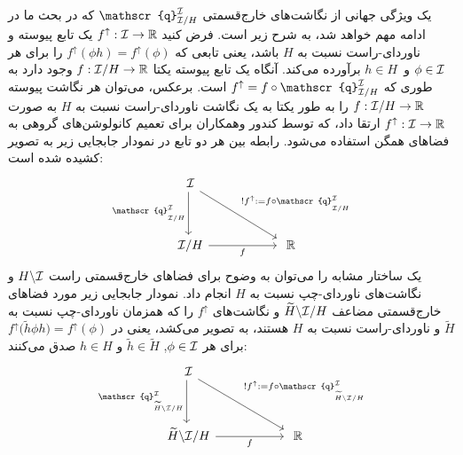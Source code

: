 یک ویژگی جهانی از نگاشت‌های خارج‌قسمتی $\mathscr{q}^{\I}_{\I/H}$ که در بحث ما در ادامه مهم خواهد شد، به شرح زیر است.
فرض کنید $f^\uparrow: \mathcal{I} \to \mathbb{R}$ یک تابع پیوسته و ناوردای-راست نسبت به $H$ باشد، یعنی تابعی که $f^\uparrow(\phi h) = f^\uparrow(\phi)$ را برای هر $\phi\in\mathcal{I}$ و~$h\in H$ برآورده می‌کند.
آنگاه یک تابع پیوسته یکتا $f: \mathcal{I}/H \to \mathbb{R}$ وجود دارد به طوری که $f^\uparrow = f \circ \mathscr{q}^{\I}_{\I/H}$ است.
برعکس، می‌توان هر نگاشت پیوسته $f: \mathcal{I}/H \to \mathbb{R}$ را به طور یکتا به یک نگاشت ناوردای-راست نسبت به $H$ به صورت $f^\uparrow: \mathcal{I} \to \mathbb{R}$ ارتقا داد، که توسط کندور وهمکاران\cite{Kondor2018-GENERAL} برای تعمیم کانولوشن‌های گروهی به فضاهای همگن استفاده می‌شود.
رابطه بین هر دو تابع در نمودار جابجایی زیر به تصویر کشیده شده است:
\begin{equation}
	\label{cd:left_cosets_lift}
	\begin{tikzcd}[column sep=55pt, row sep=35pt, font=\normalsize]
		\I
		\arrow[rd, "{!f^\uparrow := f\circ \mathscr{q}^{\I}_{\overset{}{\I/H}}}"]
		\arrow[d, "{\mathscr{q}^{\I}_{\overset{}{\I/H}}}"']
		\\
		\I/H
		\arrow[r, "f"']
		& \R
	\end{tikzcd}
\end{equation}
یک ساختار مشابه را می‌توان به وضوح برای فضاهای خارج‌قسمتی راست $H\backslash\mathcal{I}$ و نگاشت‌های ناوردای-چپ نسبت به $H$ انجام داد.
نمودار جابجایی زیر مورد فضاهای خارج‌قسمتی مضاعف $\widetilde{H} \backslash \mathcal{I}/H$ و نگاشت‌های $f^\uparrow$ را که همزمان ناوردای-چپ نسبت به $\widetilde{H}$ و ناوردای-راست نسبت به $H$ هستند، به تصویر می‌کشد، یعنی در ${f^\uparrow\big(\widetilde{h}\phi h\big) = f^\uparrow(\phi)}$ برای هر ${\phi\in\mathcal{I}}$, ${\widetilde{h}\in\widetilde{H}}$ و ${h\in H}$ صدق می‌کنند:
\begin{equation}
	\label{cd:double_cosets_lift}
	\begin{tikzcd}[column sep=55pt, row sep=35pt, font=\normalsize]
		\I
		\arrow[rd, "{!f^\uparrow := f\circ \mathscr{q}^{\I}_{\overset{}{\widetilde{H} \backslash \I/H}}}"]
		\arrow[d, "{\mathscr{q}^{\I}_{\overset{}{\widetilde{H} \backslash \I/H}}}"']
		\\
		\widetilde{H} \backslash \I/H
		\arrow[r, "f"']
		& \R
	\end{tikzcd}
\end{equation}




